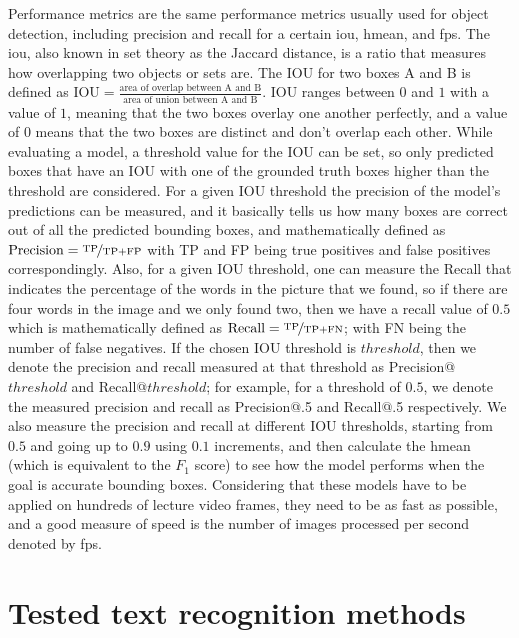 Performance metrics are the same performance metrics usually used for object detection, including precision and recall for a certain \gls{iou}, \gls{hmean}, and \gls{fps}. The \gls{iou}, also known in set theory as the Jaccard distance, is a ratio that measures how overlapping two objects or sets are. The IOU for two boxes A and B is defined as $\text{IOU} = \frac{\text{area of overlap between A and B}}{\text{area of union between A and B}}$. IOU ranges between $0$ and $1$ with a value of $1$, meaning that the two boxes overlay one another perfectly, and a value of $0$ means that the two boxes are distinct and don't overlap each other. While evaluating a model, a threshold value for the IOU can be set, so only predicted boxes that have an IOU with one of the grounded truth boxes higher than the threshold are considered. For a given IOU threshold the precision of the model's predictions can be measured, and it basically tells us how many boxes are correct out of all the predicted bounding boxes, and mathematically defined as $\text{Precision} = \nicefrac{\text{TP}}{\text{TP} + \text{FP}}$ with TP and FP being true positives and false positives correspondingly. Also, for a given IOU threshold, one can measure the Recall that indicates the percentage of the words in the picture that we found, so if there are four words in the image and we only found two, then we have a recall value of $0.5$ which is mathematically defined as $\text{Recall} = \nicefrac{\text{TP}}{\text{TP} + \text{FN}}$; with FN being the number of false negatives. If the chosen IOU threshold is $threshold$, then we denote the precision and recall measured at that threshold as Precision@$threshold$ and Recall@$threshold$; for example, for a threshold of $0.5$, we denote the measured precision and recall as Precision@.5 and Recall@.5 respectively. We also measure the precision and recall at different IOU thresholds, starting from $0.5$ and going up to $0.9$ using $0.1$ increments, and then calculate the \gls{hmean} (which is equivalent to the $F_1$ score) to see how the model performs when the goal is accurate bounding boxes. Considering that these models have to be applied on hundreds of lecture video frames, they need to be as fast as possible, and a good measure of speed is the number of images processed per second denoted by \gls{fps}.

\section{Tested text recognition methods}

